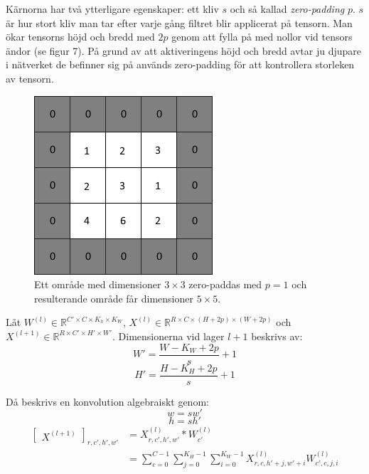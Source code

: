 \documentclass[a4paper,11pt,twoside]{article}
\begin{document}
Kärnorna har två ytterligare egenskaper: ett kliv $s$ och så kallad \textit{zero-padding} $p$. $s$ är hur stort kliv man tar efter varje gång filtret blir applicerat på tensorn. Man ökar tensorns höjd och bredd med $2p$ genom att fylla på med nollor vid tensors ändor (se figur 7). På grund av att aktiveringens höjd och bredd avtar ju djupare i nätverket de befinner sig på används zero-padding för att kontrollera storleken av tensorn. \cite{cs231n} \cite{convmath} \cite{convarithmetic}

\begin{figure}[h]\label{figzeropad}
	\centering
  		\includegraphics[scale=0.7]{zeropadding.png}
  	\caption{Ett område med dimensioner $3 \times 3$ zero-paddas med $p=1$ och resulterande område får dimensioner $5 \times 5$.}
\end{figure}

Låt $W^{(l)} \in \mathbb{R}^{C' \times C  \times K_h \times K_W}$, $X^{(l)} \in \mathbb{R}^{R \times C  \times (H+2p) \times (W+2p)}$ och $X^{(l+1)} \in \mathbb{R}^{R \times C'  \times H' \times W'}$. Dimensionerna vid lager $l+1$ beskrivs av: \cite{cs231n} \cite{convmath} \cite{convarithmetic}
\begin{equation}
W' = \frac{W-K_W+2p}{s} +1
\end{equation}
\begin{equation}
H' = \frac{H-K_H+2p}{s} +1
\end{equation}

Då beskrivs en konvolution algebraiskt genom: \cite{cs231n} \cite{convmath}
\begin{equation}
w = sw'
\end{equation}
\begin{equation}
h = sh'
\end{equation}
\begin{equation}\label{konvolution}
\begin{split}
	\begin{bmatrix} X^{(l+1)} \end{bmatrix}_{r, c', h', w'}	
		& = X^{(l)}_{r, c', h', w'} *W^{(l)}_{c'} \\
		& = \sum^{C-1}_{c=0} \sum^{K_H-1}_{j=0} \sum^{K_W-1}_{i=0} X^{(l)}_{r, c, h'+j, w'+i}W^{(l)}_{c', c, j, i}
\end{split}
\end{equation}
\end{document}
